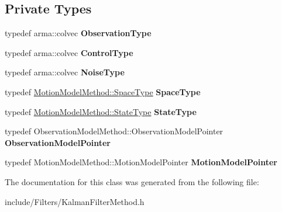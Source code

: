 \subsection*{\-Private \-Types}
\begin{DoxyCompactItemize}
\item 
\hypertarget{class_kalman_filter_method_a2718a343b6cf3edf6c8226fe64e9d468}{typedef arma\-::colvec {\bfseries \-Observation\-Type}}\label{class_kalman_filter_method_a2718a343b6cf3edf6c8226fe64e9d468}

\item 
\hypertarget{class_kalman_filter_method_adbc3ad1e37351d9131606dd0b7be1bc5}{typedef arma\-::colvec {\bfseries \-Control\-Type}}\label{class_kalman_filter_method_adbc3ad1e37351d9131606dd0b7be1bc5}

\item 
\hypertarget{class_kalman_filter_method_aeeec5cac3998634d89ff52570dd087a5}{typedef arma\-::colvec {\bfseries \-Noise\-Type}}\label{class_kalman_filter_method_aeeec5cac3998634d89ff52570dd087a5}

\item 
\hypertarget{class_kalman_filter_method_a9fad30fff8a91e24a894d284ffab38e8}{typedef \*
\hyperlink{class_s_e2_belief_space}{\-Motion\-Model\-Method\-::\-Space\-Type} {\bfseries \-Space\-Type}}\label{class_kalman_filter_method_a9fad30fff8a91e24a894d284ffab38e8}

\item 
\hypertarget{class_kalman_filter_method_a26f4e426a422c85e1ad9096180a0e240}{typedef \*
\hyperlink{class_s_e2_belief_space_1_1_state_type}{\-Motion\-Model\-Method\-::\-State\-Type} {\bfseries \-State\-Type}}\label{class_kalman_filter_method_a26f4e426a422c85e1ad9096180a0e240}

\item 
\hypertarget{class_kalman_filter_method_a353dd8a63c75605e197382224cca2f7e}{typedef \*
\-Observation\-Model\-Method\-::\-Observation\-Model\-Pointer {\bfseries \-Observation\-Model\-Pointer}}\label{class_kalman_filter_method_a353dd8a63c75605e197382224cca2f7e}

\item 
\hypertarget{class_kalman_filter_method_a9f792b6e5b6e7fc97fab550ce5e7440e}{typedef \*
\-Motion\-Model\-Method\-::\-Motion\-Model\-Pointer {\bfseries \-Motion\-Model\-Pointer}}\label{class_kalman_filter_method_a9f792b6e5b6e7fc97fab550ce5e7440e}

\end{DoxyCompactItemize}


\-The documentation for this class was generated from the following file\-:\begin{DoxyCompactItemize}
\item 
include/\-Filters/\-Kalman\-Filter\-Method.\-h\end{DoxyCompactItemize}
